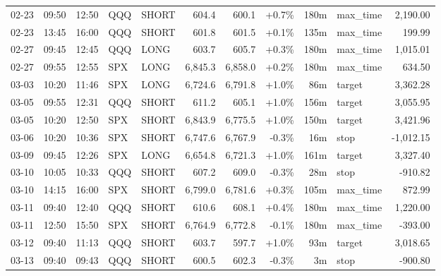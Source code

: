 \documentclass[11pt,a4paper,twoside]{article}
\begin{document}
\begin{center}
\begin{longtable}{>{\color{txtmain}}l l l l l r r r r >{\color{txtmain}}l r}
02-23 & 09:50 & 12:50 & QQQ & SHORT & 604.4 & 600.1 & \textcolor{wingreen}{+0.7\%} & 180m & max\_time & \textcolor{wingreen}{2,190.00} \\
02-23 & 13:45 & 16:00 & QQQ & SHORT & 601.8 & 601.5 & \textcolor{wingreen}{+0.1\%} & 135m & max\_time & \textcolor{wingreen}{199.99} \\
02-27 & 09:45 & 12:45 & QQQ & LONG & 603.7 & 605.7 & \textcolor{wingreen}{+0.3\%} & 180m & max\_time & \textcolor{wingreen}{1,015.01} \\
02-27 & 09:55 & 12:55 & SPX & LONG & 6,845.3 & 6,858.0 & \textcolor{wingreen}{+0.2\%} & 180m & max\_time & \textcolor{wingreen}{634.50} \\
03-03 & 10:20 & 11:46 & SPX & LONG & 6,724.6 & 6,791.8 & \textcolor{wingreen}{+1.0\%} & 86m & target & \textcolor{wingreen}{3,362.28} \\
03-05 & 09:55 & 12:31 & QQQ & SHORT & 611.2 & 605.1 & \textcolor{wingreen}{+1.0\%} & 156m & target & \textcolor{wingreen}{3,055.95} \\
03-05 & 10:20 & 12:50 & SPX & SHORT & 6,843.9 & 6,775.5 & \textcolor{wingreen}{+1.0\%} & 150m & target & \textcolor{wingreen}{3,421.96} \\
03-06 & 10:20 & 10:36 & SPX & SHORT & 6,747.6 & 6,767.9 & \textcolor{lossred}{-0.3\%} & 16m & stop & \textcolor{lossred}{-1,012.15} \\
03-09 & 09:45 & 12:26 & SPX & LONG & 6,654.8 & 6,721.3 & \textcolor{wingreen}{+1.0\%} & 161m & target & \textcolor{wingreen}{3,327.40} \\
03-10 & 10:05 & 10:33 & QQQ & SHORT & 607.2 & 609.0 & \textcolor{lossred}{-0.3\%} & 28m & stop & \textcolor{lossred}{-910.82} \\
03-10 & 14:15 & 16:00 & SPX & SHORT & 6,799.0 & 6,781.6 & \textcolor{wingreen}{+0.3\%} & 105m & max\_time & \textcolor{wingreen}{872.99} \\
03-11 & 09:40 & 12:40 & QQQ & SHORT & 610.6 & 608.1 & \textcolor{wingreen}{+0.4\%} & 180m & max\_time & \textcolor{wingreen}{1,220.00} \\
03-11 & 12:50 & 15:50 & SPX & SHORT & 6,764.9 & 6,772.8 & \textcolor{lossred}{-0.1\%} & 180m & max\_time & \textcolor{lossred}{-393.00} \\
03-12 & 09:40 & 11:13 & QQQ & SHORT & 603.7 & 597.7 & \textcolor{wingreen}{+1.0\%} & 93m & target & \textcolor{wingreen}{3,018.65} \\
03-13 & 09:40 & 09:43 & QQQ & SHORT & 600.5 & 602.3 & \textcolor{lossred}{-0.3\%} & 3m & stop & \textcolor{lossred}{-900.80} \\

\end{longtable}
\end{center}
\end{document}
